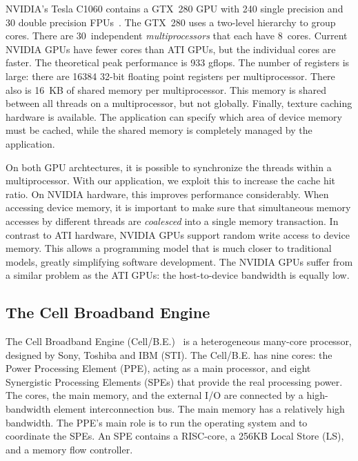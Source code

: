 \documentclass{article}
\begin{document}
NVIDIA's Tesla C1060 contains a GTX~280 GPU with 240 single precision
and 30 double precision FPUs~\cite{cuda-manual}. The GTX~280 uses a two-level hierarchy to group cores.
There are 30~independent \emph{multiprocessors\/} that each have 8~cores.
Current NVIDIA GPUs have fewer
cores than ATI GPUs, but the individual cores are faster.
The theoretical peak performance is 933 gflops.
The number of registers is large: there are 16384 32-bit floating
point registers per multiprocessor. There also is 16~KB of shared
memory per multiprocessor.  This memory is shared between all threads
on a multiprocessor, but not globally.  Finally, texture caching
hardware is available.  The application can specify which area of
device memory must be cached, while the shared memory is completely
managed by the application.

On both GPU archtectures, it is possible to synchronize the threads within a
multiprocessor.  With our application, we exploit this to increase the
cache hit ratio. On NVIDIA hardware, this improves performance considerably.  When
accessing device memory, it is important to make sure that
simultaneous memory accesses by different threads are \emph{coalesced}
into a single memory transaction.  In contrast to ATI hardware, NVIDIA
GPUs support random write access to device memory. This allows a
programming model that is much closer to traditional models, greatly
simplifying software development.  The NVIDIA GPUs suffer from a
similar problem as the ATI GPUs: the host-to-device bandwidth is
equally low.



\subsection{The Cell Broadband Engine}

The Cell Broadband Engine (\mbox{Cell/B.E.})~\cite{cell} is a
heterogeneous many-core processor, designed by Sony, Toshiba and IBM
(STI).  The \mbox{Cell/B.E.} has nine cores: the Power Processing
Element (PPE), acting as a main processor, and eight Synergistic
Processing Elements (SPEs) that provide the real processing power.
The cores, the main memory, and the external I/O are connected by a
high-bandwidth element interconnection bus.  The main memory has
a relatively high bandwidth.  The PPE's main role is to
run the operating system and to coordinate the SPEs.  An SPE contains
a RISC-core, a 256KB Local Store (LS), and a memory flow controller.
\end{document}
